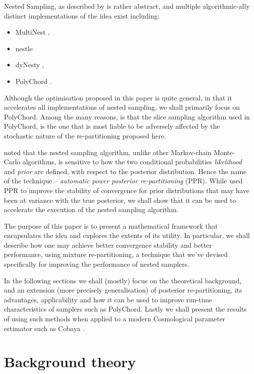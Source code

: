 \documentclass[usenatbib]{mnras}
\begin{document}
Nested Sampling, as described by \citeauthor{Skilling2006} is rather
abstract, and multiple algorithmic-ally distinct implementations of
the idea exist including:
\begin{itemize}
\item MultiNest \citep{Feroz2009MultiNestAE},
\item nestle \citep{nestle}
\item dyNesty \citep{Speagle_2020},
\item PolyChord \citep{polychord}.
\end{itemize}
Although the optimisation proposed in this paper is quite general,
in that it accelerates all implementations of nested sampling, we
shall primarily focus on PolyChord. Among the many reasons, is that
the slice sampling algorithm used in PolyChord, is the one that is
most liable to be adversely affected by the stochastic nature of the
re-partitioning proposed here.

\cite{chen-ferroz-hobson} noted that the nested sampling algorithm,
unlike other Markov-chain Monte-Carlo algorithms, is sensitive to
how the two conditional probabilities \emph{likelihood} and \emph{prior} are
defined, with respect to the posterior distribution. Hence the name
of the technique -- \emph{automatic power posterior re-partitioning}
(PPR). While \citeauthor{chen-ferroz-hobson} used PPR to improve the
stability of convergence for prior distributions that may have been
at variance with the true posterior, we shall show that it can be
used to accelerate the execution of the nested sampling
algorithm. 

The purpose of this paper is to present a mathematical framework
that encapsulates the idea and explores the extents of its
utility. In particular, we shall describe how one may achieve better
convergence stability and better performance, using mixture
re-partitioning, a technique that we've devised specifically for
improving the performance of nested samplers.

In the following sections we shall (mostly) focus on the theoretical
background, and an extension (more precisely generalisation) of
posterior re-partitioning, its advantages, applicability and how it
can be used to improve run-time characteristics of samplers such as
PolyChord. Lastly we shall present the results of using such methods
when applied to a modern Cosmological parameter estimator such as
Cobaya \citep{cobaya}.

\section{Background theory}
\label{sec:orgd8bf285}
\end{document}
